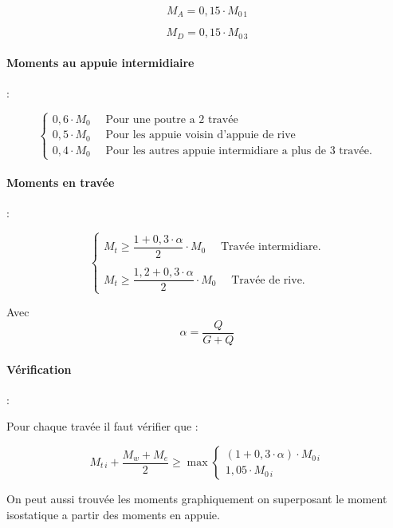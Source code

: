 \documentclass[12pt,a4paper]{article}
\begin{document}
	
	\[ M_{A} = 0,15 \cdot M_{0\,1} \]
	
	\[ M_{D} = 0,15 \cdot M_{0\,3} \]
	
	
	\paragraph{Moments au appuie intermidiaire}:
	
	\[
	\begin{cases}
		0,6 \cdot M_{0} \quad\text{ Pour une poutre a 2 travée} \\
		0,5 \cdot M_{0} \quad\text{ Pour les appuie voisin d'appuie de rive} \\
		0,4 \cdot M_{0} \quad\text{ Pour les autres appuie intermidiare a plus de 3 travée.}
	\end{cases}
	\]	
	
	\paragraph{Moments en travée}:
	
	\[
	\begin{cases}
		M_{t} \geq \dfrac{1 + 0,3 \cdot \alpha}{2} \cdot M_{0} \quad\text{ Travée intermidiare.} \\ \\
		M_{t} \geq \dfrac{1,2 + 0,3 \cdot \alpha}{2} \cdot M_{0} \quad\text{ Travée de rive.}
	\end{cases}
	\]	
	
	Avec \[ \alpha = \dfrac{Q}{G + Q} \]
	
	\paragraph{Vérification}:
	
	Pour chaque travée il faut vérifier que :
	
	\[ M_{t\,i} + \dfrac{M_{w} + M_{e}}{2} \geq \max 
	\begin{cases}
		(1 + 0,3 \cdot \alpha) \cdot M_{0\,i} \\
		1,05 \cdot M_{0\,i}
	\end{cases}
	 \]
	
	\vspace{3\baselineskip}
	
	\begin{tcolorbox}[colback=gray!20, colframe=black, title=Remarque]
		On peut aussi trouvée les moments graphiquement on superposant le moment isostatique a partir des moments en appuie.
	\end{tcolorbox}
	
\end{document}

